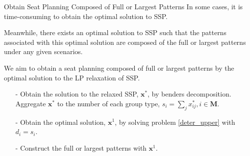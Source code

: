 \begin{frame}{Obtain Seat Planning Composed of Full or Largest Patterns}
  In some cases, it is time-consuming to obtain the optimal solution to SSP. 
  \vspace{0.5cm}

  Meanwhile, there exists an optimal solution to SSP such that the patterns associated with this {\color{red} optimal solution} are composed of the {\color{red} full or largest patterns} under any given scenarios.
  \vspace{0.5cm}

  We aim to obtain a seat planning composed of full or largest patterns by the optimal solution to the LP relaxation of SSP.

  \begin{itemize}
    \item[-] Obtain the solution to the relaxed SSP, $\mathbf{x}^{*}$, by benders decomposition. Aggregate $\mathbf{x}^{*}$ to the number of each group type, ${s}_{i} =\sum_{j} x^{*}_{ij}, i \in \mathbf{M}$.

    \item[-] Obtain the optimal solution, $\mathbf{x}^{1}$, by solving problem \eqref{deter_upper} with $d_{i} = {s}_{i}$. 
     
    \item[-] Construct the full or largest patterns with $\mathbf{x}^{1}$.
 \end{itemize}
\end{frame}
